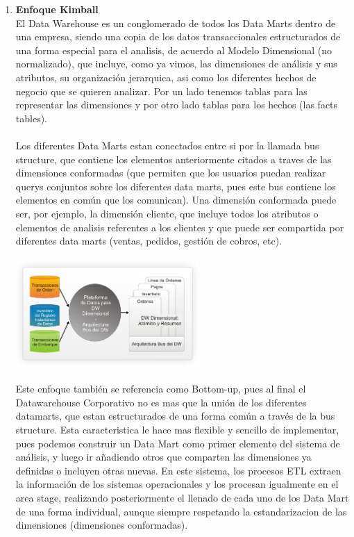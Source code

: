 \documentclass[twoside,twocolumn]{article}
\begin{document}
\begin{enumerate}
 \item \textbf{Enfoque Kimball}\\
El Data Warehouse es un conglomerado de todos los Data Marts dentro de una empresa, siendo una copia de los datos transaccionales estructurados de una forma especial para el analisis, de acuerdo al Modelo Dimensional (no normalizado), que incluye, como ya vimos, las dimensiones de análisis y sus atributos, su organización jerarquica, asi como los diferentes hechos de negocio que se quieren analizar. Por un lado tenemos tablas para las representar las dimensiones y por otro lado tablas para los hechos (las facts tables).
\\ \\
Los diferentes Data Marts estan conectados entre si por la llamada bus structure, que contiene los elementos anteriormente citados a traves de las dimensiones conformadas (que permiten que los usuarios puedan realizar querys conjuntos sobre los diferentes data marts, pues este bus contiene los elementos en común que los comunican). Una dimensión conformada puede ser, por ejemplo, la dimensión cliente, que incluye todos los atributos o elementos de analisis referentes a los clientes y que puede ser compartida por diferentes data marts (ventas, pedidos, gestión de cobros, etc).
\includegraphics[width=7cm, height=5cm]{Imagenes/enfoque-kimball}
\\
   Este enfoque también se referencia como Bottom-up, pues al final el Datawarehouse Corporativo no es mas que la unión de los diferentes datamarts, que estan estructurados de una forma común a través de la bus structure. Esta caracteristica le hace mas flexible y sencillo de implementar, pues podemos construir un Data Mart como primer elemento del sistema de análisis, y luego ir añadiendo otros que comparten las dimensiones ya definidas o incluyen otras nuevas. En este sistema, los procesos ETL extraen la información de los sistemas operacionales y los procesan igualmente en el area stage, realizando posteriormente el llenado de cada uno de los Data Mart de una forma individual, aunque siempre respetando la estandarizacion de las dimensiones (dimensiones conformadas).


\end{enumerate}
\end{document}
